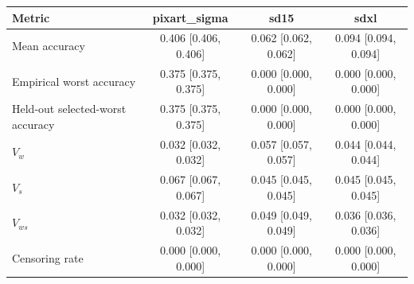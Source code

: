 \begin{tabular}{@{}lccc@{}}
\toprule
Metric & pixart\_sigma & sd15 & sdxl \\
\midrule
Mean accuracy & 0.406 [0.406, 0.406] & 0.062 [0.062, 0.062] & 0.094 [0.094, 0.094] \\
Empirical worst accuracy & 0.375 [0.375, 0.375] & 0.000 [0.000, 0.000] & 0.000 [0.000, 0.000] \\
Held-out selected-worst accuracy & 0.375 [0.375, 0.375] & 0.000 [0.000, 0.000] & 0.000 [0.000, 0.000] \\
$V_w$ & 0.032 [0.032, 0.032] & 0.057 [0.057, 0.057] & 0.044 [0.044, 0.044] \\
$V_s$ & 0.067 [0.067, 0.067] & 0.045 [0.045, 0.045] & 0.045 [0.045, 0.045] \\
$V_{ws}$ & 0.032 [0.032, 0.032] & 0.049 [0.049, 0.049] & 0.036 [0.036, 0.036] \\
Censoring rate & 0.000 [0.000, 0.000] & 0.000 [0.000, 0.000] & 0.000 [0.000, 0.000] \\
\bottomrule
\end{tabular}
